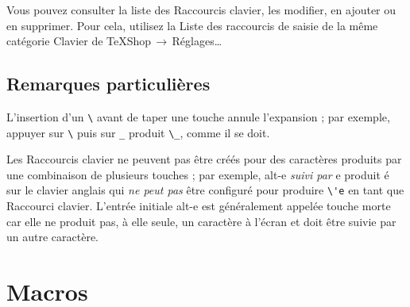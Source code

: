 \documentclass[11pt,french]{article}
\newcommand{\mnu}[1]{\textsf{#1}}
\newcommand{\cmd}[1]{\textsf{#1}}
\newcommand{\To}{\,\(\to\)\,}
\begin{document}
Vous pouvez consulter la liste des \cmd{Raccourcis clavier}, les modifier, en ajouter ou en supprimer. Pour cela, utilisez la \mnu{Liste des raccourcis de saisie} de la même catégorie \mnu{Clavier} de \mnu{TeXShop}\To\mnu{Réglages…}


\subsection{Remarques particulières}


 

L'insertion d'un \verb+\+ avant de taper une touche annule l'expansion ; par exemple, appuyer sur \verb+\+ puis sur \verb+_+ produit \verb+\_+, comme il se doit.

Les \cmd{Raccourcis clavier} ne peuvent pas être créés pour des caractères produits par une combinaison de plusieurs touches ; par exemple, \cmd{alt-e} \emph{suivi par} e produit é sur le clavier anglais qui \emph{ne peut pas} être configuré pour produire \verb+\'e+ en tant que \cmd{Raccourci clavier}. L'entrée initiale \cmd{alt-e} est généralement appelée \cmd{touche morte} car elle ne produit pas, à elle seule, un caractère à l'écran et doit être suivie par un autre caractère.

\section{\cmd{Macros}}

\end{document}
